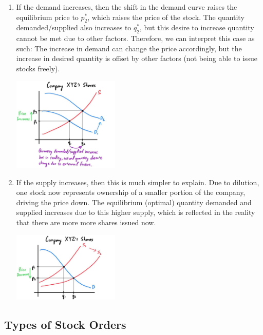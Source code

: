 \documentclass{article}
\begin{document}
    \begin{enumerate}
      \item If the demand increases, then the shift in the demand curve raises the equilibrium price to $p_2^*$, which raises the price of the stock. The quantity demanded/supplied also increases to $q_2^*$, but this desire to increase quantity cannot be met due to other factors. Therefore, we can interpret this case as such: The increase in demand can change the price accordingly, but the increase in desired quantity is offset by other factors (not being able to issue stocks freely). 
      \begin{center}
        \includegraphics[width=0.4\textwidth]{img/Stock_Demand_Increase.jpg}
      \end{center}

      \item If the supply increases, then this is much simpler to explain. Due to dilution, one stock now represents ownership of a smaller portion of the company, driving the price down. The equilibrium (optimal) quantity demanded and supplied increases due to this higher supply, which is reflected in the reality that there are more more shares issued now. 
      \begin{center}
        \includegraphics[width=0.4\textwidth]{img/Stock_Supply_Increase.jpg}
      \end{center}
    \end{enumerate}

  \subsection{Types of Stock Orders}
\end{document}
